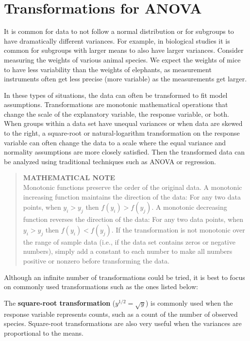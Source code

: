 \documentclass[
]{report}
\begin{document}
\hypertarget{transformations-for-anova}{%
\section*{Transformations for ANOVA}\label{transformations-for-anova}}

It is common for data to not follow a normal distribution or for subgroups to have dramatically different variances. For example, in biological studies it is common for subgroups with larger means to also have larger variances. Consider measuring the weights of various animal species. We expect the weights of mice to have less variability than the weights of elephants, as measurement instruments often get less precise (more variable) as the measurements get larger.

In these types of situations, the data can often be transformed to fit model assumptions. Transformations are monotonic mathematical operations that change the scale of the explanatory variable, the response variable, or both. When groups within a data set have unequal variances or when data are skewed to the right, a square-root or natural-logarithm transformation on the response variable can often change the data to a scale where the equal variance and normality assumptions are more closely satisfied. Then the transformed data can be analyzed using traditional techniques such as ANOVA or regression.

\begin{quote}
\textbf{MATHEMATICAL NOTE}\\
Monotonic functions preserve the order of the original data. A monotonic increasing function maintains the direction of the data: For any two data points, when \(y_i > y_j\) then \(f(y_i) > f(y_j)\). A monotonic decreasing function reverses the direction of the data: For any two data points, when \(y_i > y_j\) then \(f(y_i) < f(y_j)\). If the transformation is not monotonic over the range of sample data (i.e., if the data set contains zeros or negative numbers), simply add a constant to each number to make all numbers positive or nonzero before transforming the data.
\end{quote}

Although an infinite number of transformations could be tried, it is best to focus on commonly used transformations such as the ones listed below:

The \textbf{square-root transformation} (\(y^{1/2} = \sqrt{y}\)) is commonly used when the response variable represents counts, such as a count of the number of observed species. Square-root transformations are also very useful when the variances are proportional to the means.
\end{document}
